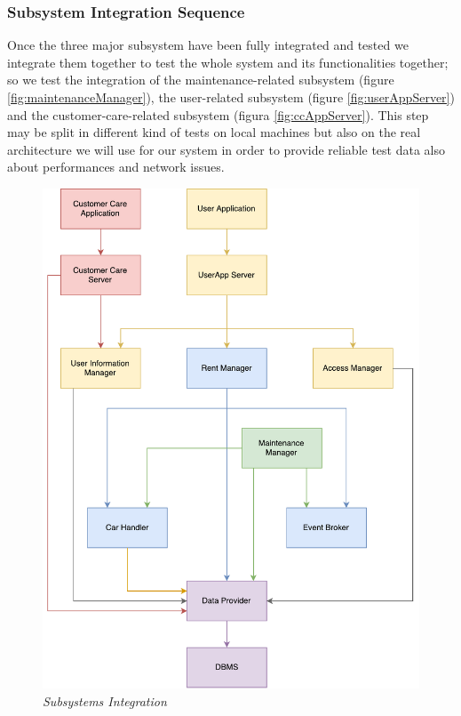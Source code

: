 \clearpage 

\subsubsection{Subsystem Integration Sequence}
Once the three major subsystem have been fully integrated and tested we integrate them together to test the whole system and its functionalities together; so we test the integration of the maintenance-related subsystem (figure \ref{fig:maintenanceManager}), the user-related subsystem (figure \ref{fig:userAppServer}) and the customer-care-related subsystem (figura \ref{fig:ccAppServer}).
This step may be split in different kind of tests on local machines but also on the real architecture we will use for our system in order to provide reliable test data also about performances and network issues. \\

	\begin{figure}[h]
			\centering
			\includegraphics[width=0.9\linewidth]{img/subsystemIntegration}
			\caption{
				\label{fig:subsystemIntegration} 
				\emph{Subsystems Integration}
			}
		\end{figure}
